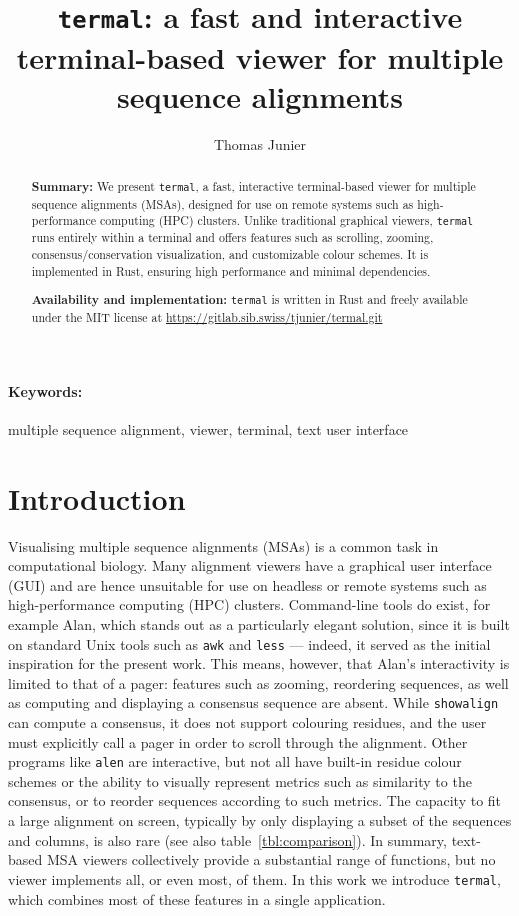 \documentclass[11pt]{article}
\title{%
\texttt{termal}: a fast and interactive terminal-based viewer for multiple sequence alignments
}
\author[1]{Thomas Junier}
\affil[1]{Swiss Institute of Bioinformatics, Vital-\textsc{it} Group, Bâtiment
Amphipôle, Quartier UNIL-Sorge, CH-1015 Lausanne, Switzerland -- 
\texttt{thomas.junier@sib.swiss} -- ORCID: 0000-0002-4015-5969}
\date{} %
\begin{document}
\maketitle

\begin{abstract} \textbf{Summary:} We present \texttt{termal}, a fast,
  interactive terminal-based viewer for multiple sequence alignments (MSAs),
  designed for use on remote systems such as high-performance computing (HPC)
  clusters. Unlike traditional graphical viewers, \texttt{termal} runs entirely
  within a terminal and offers features such as scrolling, zooming,
  consensus/conservation visualization, and customizable colour schemes. It is
  implemented in Rust, ensuring high performance and minimal dependencies.

	\textbf{Availability and implementation:} \texttt{termal} is written in Rust
	and freely available under the MIT license at
	\url{https://gitlab.sib.swiss/tjunier/termal.git}

\end{abstract}

\paragraph*{Keywords:} multiple sequence alignment, viewer, terminal, text user interface

\section*{Introduction}

Visualising multiple sequence alignments (MSAs) is a common task in
computational biology. Many alignment viewers have a graphical user interface
(GUI) and are hence unsuitable for use on headless or remote systems such as
high-performance computing (HPC) clusters.  Command-line tools do exist, for
example Alan\cite{alan}, which stands out as a particularly elegant solution,
since it is built on standard Unix tools such as \texttt{awk} and \texttt{less}
--- indeed, it served as the initial inspiration for the present work. This
means, however, that Alan's interactivity is limited to that of a pager:
features such as zooming, reordering sequences, as well as computing and
displaying a consensus sequence are absent. While
\texttt{showalign}\cite{emboss} can compute a consensus, it does not support
colouring residues, and the user must explicitly call a pager in order to scroll
through the alignment. Other programs like \texttt{alen}\cite{alen} are
interactive, but not all have built-in residue colour schemes or the ability to
visually represent metrics such as similarity to the consensus, or to reorder
sequences according to such metrics. The capacity to fit a large alignment on
screen, typically by only displaying a subset of the sequences and columns, is
also rare (see also table~\ref{tbl:comparison}). In summary, text-based MSA
viewers collectively provide a substantial range of functions, but no viewer
implements all, or even most, of them. In this work we introduce
\texttt{termal}, which combines most of these features in a single application.
\end{document}
